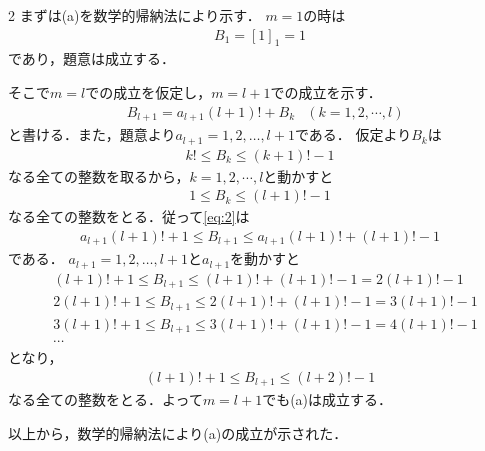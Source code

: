 \documentclass[../../main.tex]{subfiles}
\begin{document}
\begin{multicols}{2}
  まずは(a)を数学的帰納法により示す．
  $m=1$の時は
  \begin{align}
    B_1 = [1]_{1} = 1
  \end{align}
  であり，題意は成立する．

  そこで$m=l$での成立を仮定し，$m=l+1$での成立を示す．
  \begin{align}
    & B_{l+1} = a_{l+1}(l+1)! + B_{k} & (k=1,2,\cdots,l) \label{eq:2}
  \end{align}
  と書ける．また，題意より$a_{l+1}=1, 2, \dots, l+1$である．
  仮定より$B_{k}$は
  \begin{align}
    k! \le B_{k} \le (k+1)! -1
  \end{align}
  なる全ての整数を取るから，$k=1,2,\cdots,l$と動かすと
  \begin{align}
    1 \le B_{k} \le (l+1)! -1
  \end{align}
  なる全ての整数をとる．従って\cref{eq:2}は
  \begin{align}
    a_{l+1}(l+1)! + 1 \le B_{l+1} \le a_{l+1}(l+1)! + (l+1)! -1
  \end{align}
  である．
  $a_{l+1}=1, 2,\dots, l+1$と$a_{l+1}$を動かすと
  \begin{align}
    & (l+1)! + 1 \le B_{l+1} \le (l+1)! + (l+1)! -1  = 2(l+1)! -1 \\
    & 2(l+1)! + 1 \le B_{l+1} \le 2(l+1)! + (l+1)! -1= 3(l+1)! -1 \\
    & 3(l+1)! + 1 \le B_{l+1} \le 3(l+1)! + (l+1)! -1= 4(l+1)! -1 \\
    & \cdots
  \end{align}
  となり，
  \begin{align}
    (l+1)! + 1 \le B_{l+1} \le (l+2)! -1
  \end{align}
  なる全ての整数をとる．よって$m=l+1$でも(a)は成立する．

  以上から，数学的帰納法により(a)の成立が示された．


\end{multicols}
\end{document}
